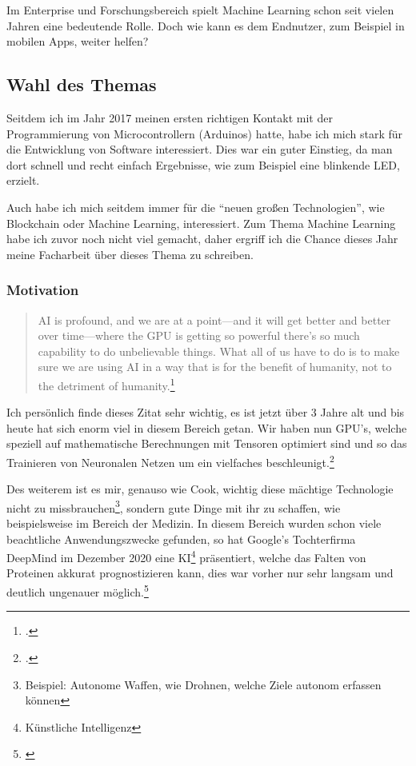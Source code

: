 Im Enterprise und Forschungsbereich spielt Machine Learning schon seit vielen Jahren eine bedeutende Rolle. Doch wie kann es dem Endnutzer, zum Beispiel in mobilen Apps, weiter helfen?

\subsection{Wahl des Themas}

Seitdem ich im Jahr 2017 meinen ersten richtigen Kontakt mit der Programmierung von Microcontrollern (Arduinos) hatte, habe ich mich stark für die Entwicklung von Software interessiert. Dies war ein guter Einstieg, da man dort schnell und recht einfach Ergebnisse, wie zum Beispiel eine blinkende LED, erzielt.

Auch habe ich mich seitdem immer für die "`neuen großen Technologien"', wie Blockchain oder Machine Learning, interessiert. Zum Thema Machine Learning habe ich zuvor noch nicht viel gemacht, daher ergriff ich die Chance dieses Jahr meine Facharbeit über dieses Thema zu schreiben.

\subsubsection{Motivation}

\begin{quotation}
    AI is profound, and we are at a point—and it will get better and better over time—where the GPU is getting so powerful there’s so much capability to do unbelievable things. What all of us have to do is to make sure we are using AI in a way that is for the benefit of humanity, not to the detriment of humanity.\footcite[Tim Cook (CEO von Apple) In einem Interview mit MIT Technology Review]{timcookquote}
\end{quotation}

Ich persönlich finde dieses Zitat sehr wichtig, es ist jetzt über 3 Jahre alt und bis heute hat sich enorm viel in diesem Bereich getan. Wir haben nun GPU's, welche speziell auf mathematische Berechnungen mit Tensoren optimiert sind und so das Trainieren von Neuronalen Netzen um ein vielfaches beschleunigt.\footcite[NVIDIA Grafikprozessoren mit integrierten Tensor Kernen]{nvidiatensorcores}

Des weiterem ist es mir, genauso wie Cook, wichtig diese mächtige Technologie nicht zu missbrauchen\footnote[3]{Beispiel: Autonome Waffen, wie Drohnen, welche Ziele autonom erfassen können}, sondern gute Dinge mit ihr zu schaffen, wie beispielsweise im Bereich der Medizin. In diesem Bereich wurden schon viele beachtliche Anwendungszwecke gefunden, so hat Google's Tochterfirma DeepMind im Dezember 2020 eine KI\footnote[4]{Künstliche Intelligenz} präsentiert, welche das Falten von Proteinen akkurat prognostizieren kann, dies war vorher nur sehr langsam und deutlich ungenauer möglich.\footnote[5]{\cite{deepmindprotein}}

